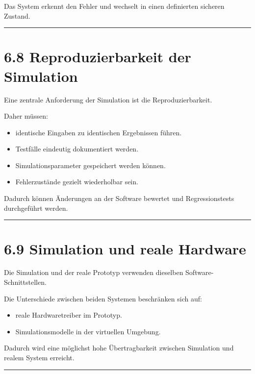 \documentclass[
]{article}
\providecommand{\tightlist}{%
  \setlength{\itemsep}{0pt}\setlength{\parskip}{0pt}}
\begin{document}
Das System erkennt den Fehler und wechselt in einen definierten sicheren
Zustand.

\begin{center}\rule{0.5\linewidth}{0.5pt}\end{center}

\section{6.8 Reproduzierbarkeit der
Simulation}\label{reproduzierbarkeit-der-simulation}

Eine zentrale Anforderung der Simulation ist die Reproduzierbarkeit.

Daher müssen:

\begin{itemize}
\tightlist
\item
  identische Eingaben zu identischen Ergebnissen führen.
\item
  Testfälle eindeutig dokumentiert werden.
\item
  Simulationsparameter gespeichert werden können.
\item
  Fehlerzustände gezielt wiederholbar sein.
\end{itemize}

Dadurch können Änderungen an der Software bewertet und Regressionstests
durchgeführt werden.

\begin{center}\rule{0.5\linewidth}{0.5pt}\end{center}

\section{6.9 Simulation und reale
Hardware}\label{simulation-und-reale-hardware}

Die Simulation und der reale Prototyp verwenden dieselben
Software-Schnittstellen.

Die Unterschiede zwischen beiden Systemen beschränken sich auf:

\begin{itemize}
\tightlist
\item
  reale Hardwaretreiber im Prototyp.
\item
  Simulationsmodelle in der virtuellen Umgebung.
\end{itemize}

Dadurch wird eine möglichst hohe Übertragbarkeit zwischen Simulation und
realem System erreicht.

\begin{center}\rule{0.5\linewidth}{0.5pt}\end{center}
\end{document}
